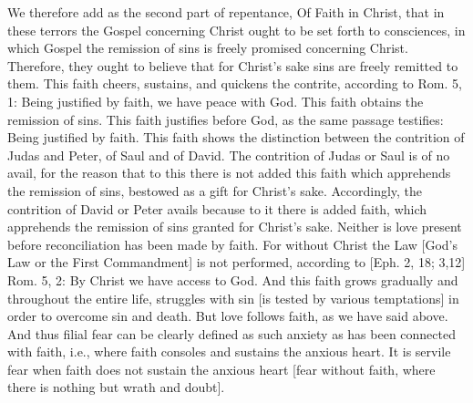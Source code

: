We therefore add as the second part of repentance, Of Faith in Christ,
that in these terrors the Gospel concerning Christ ought to be set
forth to consciences, in which Gospel the remission of sins is freely
promised concerning Christ.  Therefore, they ought to believe that
for Christ's sake sins are freely remitted to them.  This faith
cheers, sustains, and quickens the contrite, according to Rom. 5, 1:
Being justified by faith, we have peace with God.  This faith obtains
the remission of sins.  This faith justifies before God, as the same
passage testifies: Being justified by faith.  This faith shows the
distinction between the contrition of Judas and Peter, of Saul and of
David.  The contrition of Judas or Saul is of no avail, for the
reason that to this there is not added this faith which apprehends
the remission of sins, bestowed as a gift for Christ's sake.
Accordingly, the contrition of David or Peter avails because to it
there is added faith, which apprehends the remission of sins granted
for Christ's sake.  Neither is love present before reconciliation has
been made by faith.  For without Christ the Law [God's Law or the
First Commandment] is not performed, according to [Eph. 2, 18; 3,12]
Rom. 5, 2: By Christ we have access to God.  And this faith grows
gradually and throughout the entire life, struggles with sin [is
tested by various temptations] in order to overcome sin and death.
But love follows faith, as we have said above.  And thus filial fear
can be clearly defined as such anxiety as has been connected with
faith, i.e., where faith consoles and sustains the anxious heart.  It
is servile fear when faith does not sustain the anxious heart [fear
without faith, where there is nothing but wrath and doubt].

